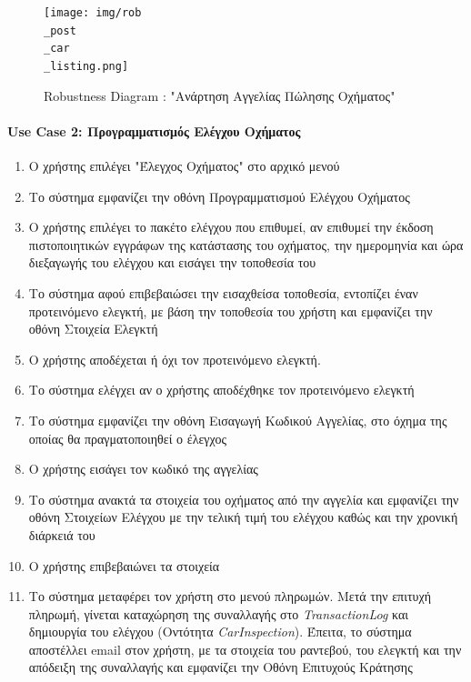 \documentclass{../ol-softwaremanual}
\begin{document}
	
	\begin{figure}[htbp!]
		\texttt{[image: img/rob\\\_post\\\_car\\\_listing.png]}
		\caption{\en Robustness Diagram : "\gr Ανάρτηση Αγγελίας Πώλησης Οχήματος\en"\gr}
	\end{figure}
	
	
	
	
	\newpage
	
	
	\paragraph{\en Use Case 2: \gr Προγραμματισμός Ελέγχου Οχήματος}
	
	\begin{enumerate}
		\item Ο χρήστης επιλέγει \en"\gr Έλεγχος Οχήματος\en" \gr στο αρχικό μενού
		\item Το σύστημα εμφανίζει την οθόνη Προγραμματισμού Ελέγχου Οχήματος
		\item Ο χρήστης επιλέγει το πακέτο ελέγχου που επιθυμεί, αν επιθυμεί την έκδοση πιστοποιητικών εγγράφων της κατάστασης του οχήματος, την ημερομηνία και ώρα διεξαγωγής του ελέγχου και εισάγει την τοποθεσία του
		\item Το σύστημα αφού επιβεβαιώσει την εισαχθείσα τοποθεσία, εντοπίζει έναν προτεινόμενο ελεγκτή, με βάση την τοποθεσία του χρήστη και εμφανίζει την οθόνη Στοιχεία Ελεγκτή
		\item Ο χρήστης αποδέχεται ή όχι τον προτεινόμενο ελεγκτή. 
		\item Το σύστημα ελέγχει αν ο χρήστης αποδέχθηκε τον προτεινόμενο ελεγκτή
		\item Το σύστημα εμφανίζει την οθόνη Εισαγωγή Κωδικού Αγγελίας, στο όχημα της οποίας θα πραγματοποιηθεί ο έλεγχος		
		\item Ο χρήστης εισάγει τον κωδικό της αγγελίας
		\item Το σύστημα ανακτά τα στοιχεία του οχήματος από την αγγελία και εμφανίζει την οθόνη Στοιχείων Ελέγχου με την τελική τιμή του ελέγχου καθώς και την χρονική διάρκειά του
		\item Ο χρήστης επιβεβαιώνει τα στοιχεία
		\item Το σύστημα μεταφέρει τον χρήστη στο μενού πληρωμών. Μετά την επιτυχή πληρωμή, γίνεται καταχώρηση της συναλλαγής στο \en \textit{TransactionLog} \gr  και δημιουργία του ελέγχου (Οντότητα \en \textit{CarInspection}\gr). Έπειτα, το σύστημα αποστέλλει \en email \gr στον χρήστη, με τα στοιχεία του ραντεβού, του ελεγκτή και την απόδειξη της συναλλαγής και εμφανίζει την Οθόνη Επιτυχούς Κράτησης
	\end{enumerate}
	
\end{document}
